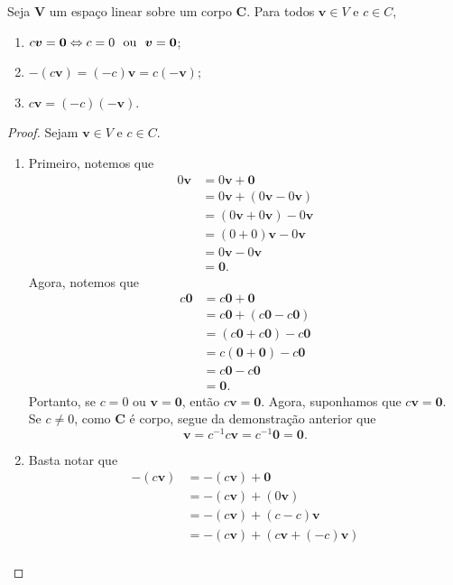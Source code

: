\begin{proposition}
Seja $\bm V$ um espaço linear sobre um corpo $\bm C$. Para todos $\bm v \in V$ e $c \in C$,
	\begin{enumerate}
	\item $c\bm v = \bm 0 \Leftrightarrow c=0 \text{\ \ ou\ \ } \bm v = \bm 0$;
	\item $-(c\bm v) = (-c)\bm v = c(- \bm v)$;
	\item $c\bm v = (-c)(- \bm v)$.
	\end{enumerate}
\end{proposition}
\begin{proof} Sejam $\bm v \in V$ e $c \in C$.
	\begin{enumerate}
	\item Primeiro, notemos que
		\begin{align*}
		0 \bm v &= 0 \bm v + \bm 0 \\
			&= 0 \bm v + (0 \bm v - 0 \bm v) \\
			&= (0 \bm v + 0 \bm v) - 0 \bm v \\
			&= (0+0) \bm v - 0 \bm v \\
			&= 0 \bm v - 0 \bm v \\
			&= \bm 0.
		  \end{align*}
Agora, notemos que
		\begin{align*}
		c \bm 0 &= c \bm 0 + \bm 0 \\
			&= c \bm 0 + (c \bm 0 - c \bm 0) \\
			&= (c \bm 0 + c \bm 0) - c \bm 0 \\
			&= c  (\bm 0 + \bm 0) - c \bm 0 \\
			&= c \bm 0 - c \bm 0 \\
			&= \bm 0.
		\end{align*}
Portanto, se $c=0$ ou $\bm v = \bm 0$, então $c\bm v = \bm 0$. Agora, suponhamos que $c\bm v =\bm 0$. Se $c \neq 0$, como $\bm C$ é corpo, segue da demonstração anterior que
		\begin{equation*}
		\bm v = c^{-1}c\bm v = c^{-1} \bm 0 = \bm 0.
		\end{equation*}
	\item Basta notar que
		\begin{align*}
		\bm -(c\bm{v}) &= \bm -(c\bm{v}) + \bm 0 \\
			&= \bm -(c\bm{v}) + (0 \bm v) \\
			&= \bm -(c\bm{v}) + (c-c) \bm v \\
			&= \bm -(c\bm{v}) + (c\bm v + (-c) \bm v) \\

\end{align*}
\end{enumerate}
\end{proof}
